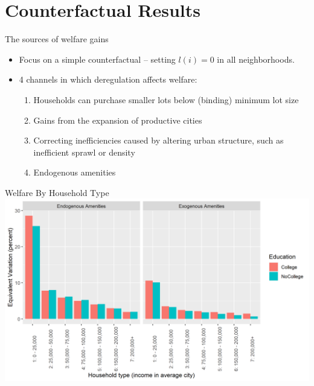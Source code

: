 \documentclass{beamer}
\begin{document}
\section{Counterfactual Results}

\begin{frame}{The sources of welfare gains}
	\begin{itemize}
		\color{black}
		\itemsep1em
		\item Focus on a simple counterfactual -- setting $l(i) = 0$ in all neighborhoods. \pause
		
		\item 4 channels in which deregulation affects welfare:
		\begin{enumerate}
			\itemsep1em
			\item Households can purchase smaller lots below (binding) minimum lot size
			\item Gains from the expansion of productive cities \citep{hseihmoretti}
			\item Correcting inefficiencies caused by altering urban structure, such as inefficient sprawl or density \citep{bbheight}
			\item Endogenous amenities 
		\end{enumerate}
	\end{itemize}
\end{frame}


\begin{frame}{Welfare By Household Type}\label{returnWelfare}
		\includegraphics[width=\textwidth]{Welfare.png}

	\hyperlink{intuition}{} 
\end{frame}
\end{document}
